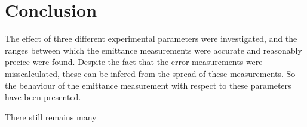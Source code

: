 
\section{Conclusion}
\label{sec:conclusion}

The effect of three different experimental parameters were investigated, and
the ranges between which the emittance measurements were accurate and reasonably
precice were found. Despite the fact that the error measurements were
misscalculated, these can be infered from the spread of these measurements.
So the behaviour of the emittance measurement with respect to these parameters
have been presented.

There still remains many 


